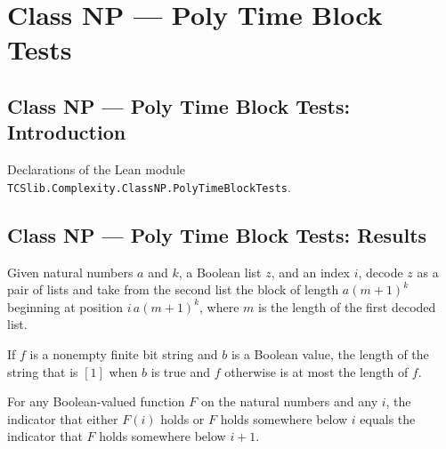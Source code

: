 \section{Class NP --- Poly Time Block Tests}
\subsection*{Class NP --- Poly Time Block Tests: Introduction}

Declarations of the Lean module \texttt{TCSlib.Complexity.ClassNP.PolyTimeBlockTests}.

\subsection*{Class NP --- Poly Time Block Tests: Results}

\begin{definition}
\label{Complexity.blockAt}
\leanok
{}
Given natural numbers $a$ and $k$, a Boolean list $z$, and an index $i$, decode $z$ as a
pair of lists and take from the second list the block of length $a(m+1)^k$ beginning at
position $i\,a(m+1)^k$, where $m$ is the length of the first decoded list.
\end{definition}

\begin{theorem}
\label{Complexity.BlockLoop.length_flag_le}
\leanok
{}
If $f$ is a nonempty finite bit string and $b$ is a Boolean value, the length of the
string that is $[1]$ when $b$ is true and $f$ otherwise is at most the length of $f$.
\end{theorem}

\begin{theorem}
\label{Complexity.BlockLoop.any_range_succ_flag}
\leanok
{}
For any Boolean-valued function $F$ on the natural numbers and any $i$, the indicator
that either $F(i)$ holds or $F$ holds somewhere below $i$ equals the indicator that $F$
holds somewhere below $i+1$.
\end{theorem}

